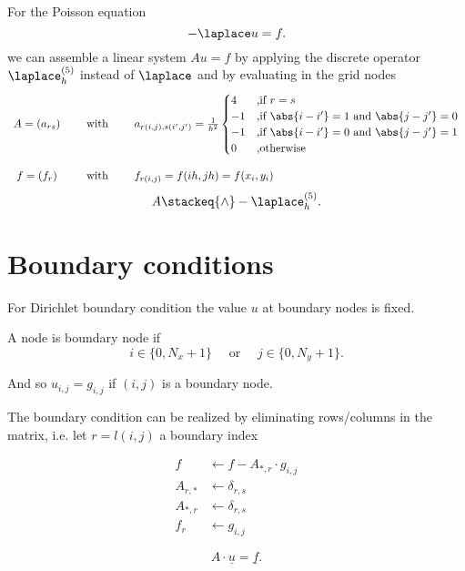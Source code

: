For the Poisson equation
\[
-\laplace u = f
.\] 
we can assemble a linear system $Au=f$ by applying the discrete operator $\laplace_{h}^{(5)}$ instead of $\laplace$ and by evaluating in the grid nodes
\[
	\begin{array}{ccl}
	A = (a_{rs}) 
	\quad&\text{ with }\quad 
	&a_{r(i,j),s(i',j')}= \frac{1}{h^{2}}\begin{cases}
		4 &\text{,if } r=s \\
		-1 &\text{,if } \abs{i-i'} = 1 \text{ and } \abs{j-j'} = 0 \\
		-1 &\text{,if } \abs{i-i'} = 0 \text{ and } \abs{j-j'} = 1 \\
		0 &\text{,otherwise}
	\end{cases} \\ \\
	f = (f_{r}) 
	\quad&\text{ with }\quad
	&f_{r(i,j)}=f(ih, jh)=f(x_{i}, y_{i})
	\end{array}
\] 
\[
	 A \stackeq{\wedge} -\laplace_{h}^{(5)}
.\] 

\section{Boundary conditions}%
\label{sec:Boundary condition}
For Dirichlet boundary condition the value $u$ at boundary nodes is fixed.

A node is boundary node if
\[
i \in  \{0, N_{x}+1\} \quad\text{ or }\quad j \in  \{0,N_{y}+1\}
.\] 

And so $u_{i,j} = g_{i,j}$ if $(i,j)$ is a boundary node.

The boundary condition can be realized by eliminating rows/columns in the matrix, i.e. let $r=l(i,j)$ a boundary index

\begin{align*}
	f &\leftarrow f-A_{\ast,r}\cdot g_{i,j} \\
	A_{r,\ast} &\leftarrow \delta_{r,s} \\
	A_{*,r} &\leftarrow \delta_{r,s} \\
	f_{r} &\leftarrow g_{i,j}
\end{align*}

\[
A\cdot \underline{u} = \underline{f}  
.\] 

